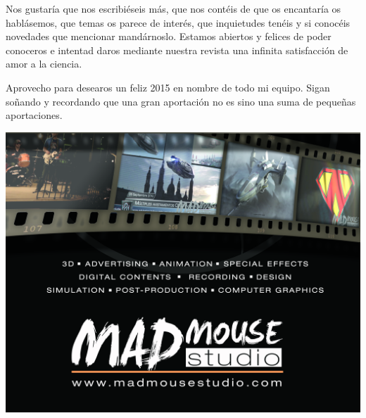 \begin{multicols}{2}
 Nos gustaría que nos escribiéseis más, que
  nos contéis de que os encantaría os hablásemos, que temas os parece
  de interés, que inquietudes tenéis y si conocéis novedades que
  mencionar mandárnoslo. Estamos abiertos y felices de poder conoceros
  e intentad daros mediante nuestra revista una infinita satisfacción
  de amor a la ciencia.

  Aprovecho para desearos un feliz 2015 en nombre de todo mi
  equipo. Sigan soñando y recordando que una gran aportación no es
  sino una suma de pequeñas aportaciones.


\end{multicols}
\vspace{2cm}
      \centering
  \includegraphics[scale=0.8]{pubmm.png}\\
 \newpage


